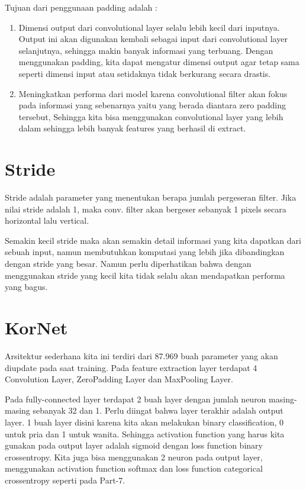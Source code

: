 Tujuan dari penggunaan padding adalah :
\begin{enumerate}
\item Dimensi output dari convolutional layer selalu lebih kecil dari inputnya. Output ini akan digunakan kembali sebagai input dari convolutional layer selanjutnya, sehingga makin banyak informasi yang terbuang. Dengan menggunakan padding, kita dapat mengatur dimensi output agar tetap sama seperti dimensi input atau setidaknya tidak berkurang secara drastis.

\item Meningkatkan performa dari model karena convolutional filter akan fokus pada informasi yang sebenarnya yaitu yang berada diantara zero padding tersebut, Sehingga kita bisa menggunakan convolutional layer yang lebih dalam sehingga lebih banyak features yang berhasil di extract.
\end{enumerate}

\section{Stride}
Stride adalah parameter yang menentukan berapa jumlah pergeseran filter. Jika nilai stride adalah 1, maka conv. filter akan bergeser sebanyak 1 pixels secara horizontal lalu vertical.

Semakin kecil stride maka akan semakin detail informasi yang kita dapatkan dari sebuah input, namun membutuhkan komputasi yang lebih jika dibandingkan dengan stride yang besar. Namun perlu diperhatikan bahwa dengan menggunakan stride yang kecil kita tidak selalu akan mendapatkan performa yang bagus.


\section{KorNet}
Arsitektur sederhana kita ini terdiri dari 87.969 buah parameter yang akan diupdate pada saat training. Pada feature extraction layer terdapat 4 Convolution Layer, ZeroPadding Layer dan MaxPooling Layer.

Pada fully-connected layer terdapat 2 buah layer dengan jumlah neuron masing-masing sebanyak 32 dan 1. Perlu diingat bahwa layer terakhir adalah output layer. 1 buah layer disini karena kita akan melakukan binary classification, 0 untuk pria dan 1 untuk wanita. Sehingga activation function yang harus kita gunakan pada output layer adalah sigmoid dengan loss function binary crossentropy. Kita juga bisa menggunakan 2 neuron pada output layer, menggunakan activation function softmax dan loss function categorical crossentropy seperti pada Part-7.

